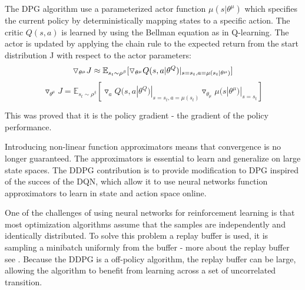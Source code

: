 The DPG algorithm use a parameterized actor function $\mu(s|\theta^\mu)$ which specifies the current policy by deterministically mapping states to a specific action. The critic $Q(s,a)$ is learned by using the Bellman equation as in Q-learning. The actor is updated by applying the chain rule to the expected return from the start distribution J with respect to the actor parameters:
\begin{equation}
\triangledown_{\theta^\mu} J \approx \mathbb{E}_{s_t \sim \rho^\beta} [\triangledown_{\theta^\mu}Q(s,a|\theta^Q)|_{s=s_t , a=\mu(s_t|\theta^\mu)}]  
\newline
\end{equation}
\begin{equation}
\triangledown_{\theta^\mu} J = \mathbb{E}_{s_t \sim \rho^\beta} [\triangledown_{a}Q(s,a|\theta^Q)|_{s=s_t , a=\mu(s_t)} \triangledown_{\theta_\mu}\mu(s|\theta^\mu)|_{s=s_t} ]
\end{equation} 

This was proved that it is the policy gradient - the gradient of the policy performance. 

Introducing non-linear function approximators means that convergence is no longer guaranteed. The approximators is essential to learn and generalize on large state spaces. The DDPG contribution is to provide modification to DPG inspired of the succes of the DQN, which allow it to use neural networks function approximators to learn in state and action space online. 

One of the challenges of using neural networks for reinforcement learning is that most optimization algorithms assume that the samples are independently  and identically distributed. To solve this problem a replay buffer is used, it is sampling a minibatch uniformly from the buffer - more about the replay buffer see . Because the DDPG is a off-policy algorithm, the replay buffer can be large, allowing the algorithm to benefit from learning across a set of uncorrelated transition.

